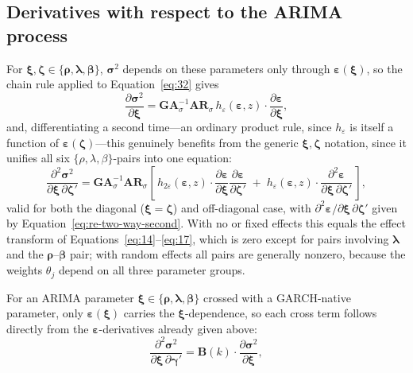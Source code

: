 \documentclass[12pt]{article}
\begin{document}
\subsection{Derivatives with respect to the ARIMA process}
For $\boldsymbol{\xi},\boldsymbol{\zeta}\in\{\boldsymbol{\rho},\boldsymbol{\lambda},\boldsymbol{\beta}\}$, $\mathbf{\sigma}^{2}$ depends on these parameters only through $\boldsymbol{\varepsilon}(\boldsymbol{\xi})$, so the chain rule applied to Equation~\ref{eq:32} gives
\begin{equation}
\frac{\partial \mathbf{\sigma}^{2} }{\partial \boldsymbol{\xi}} = \mathbf{GA}_{\sigma}^{-1}\mathbf{AR}_{\sigma}\, h_{\varepsilon}\left( \mathbf{\varepsilon}, z \right)\cdot \frac{\partial \mathbf{\varepsilon}}{\partial \boldsymbol{\xi}},
\label{eq:43}
\end{equation}
and, differentiating a second time---an ordinary product rule, since $h_{\varepsilon}$ is itself a function of $\boldsymbol{\varepsilon}(\boldsymbol{\zeta})$---this genuinely benefits from the generic $\boldsymbol{\xi},\boldsymbol{\zeta}$ notation, since it unifies all six $\{\rho,\lambda,\beta\}$-pairs into one equation:
\begin{equation}
\frac{\partial^{2} \mathbf{\sigma}^{2} }{\partial \boldsymbol{\xi}\,\partial\boldsymbol{\zeta}'} =
\mathbf{GA}_{\sigma}^{-1}\mathbf{AR}_{\sigma}\left[\, h_{2\varepsilon}\left( \mathbf{\varepsilon}, z \right)\cdot\frac{\partial \mathbf{\varepsilon}}{\partial \boldsymbol{\xi}}\frac{\partial \mathbf{\varepsilon}}{\partial \boldsymbol{\zeta}'} \;+\; h_{\varepsilon}\left( \mathbf{\varepsilon}, z \right)\cdot\frac{\partial^{2} \mathbf{\varepsilon}}{\partial \boldsymbol{\xi}\,\partial \boldsymbol{\zeta}'}\,\right],
\label{eq:44}
\end{equation}
valid for both the diagonal ($\boldsymbol{\xi}=\boldsymbol{\zeta}$) and off-diagonal case, with $\partial^{2}\boldsymbol{\varepsilon}/\partial\boldsymbol{\xi}\,\partial\boldsymbol{\zeta}'$ given by Equation~\ref{eq:re-two-way-second}. With no or fixed effects this equals the effect transform of Equations~\ref{eq:14}--\ref{eq:17}, which is zero except for pairs involving $\boldsymbol{\lambda}$ and the $\boldsymbol{\rho}$--$\boldsymbol{\beta}$ pair; with random effects all pairs are generally nonzero, because the weights $\theta_j$ depend on all three parameter groups.

For an ARIMA parameter $\boldsymbol{\xi}\in\{\boldsymbol{\rho},\boldsymbol{\lambda},\boldsymbol{\beta}\}$ crossed with a GARCH-native parameter, only $\boldsymbol{\varepsilon}(\boldsymbol{\xi})$ carries the $\boldsymbol{\xi}$-dependence, so each cross term follows directly from the $\mathbf{\varepsilon}$-derivatives already given above:
\begin{equation}
\frac{\partial^{2}\mathbf{\sigma}^{2}}
{\partial \boldsymbol{\xi}\,\partial\boldsymbol{\gamma}'}
=
\mathbf{B}(k)\cdot
\frac{\partial\mathbf{\sigma}^{2}}{\partial\boldsymbol{\xi}},
\tag{47a}
\label{eq:47a}
\end{equation}
\end{document}
